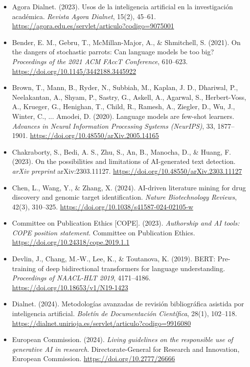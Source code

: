 \begin{itemize}[leftmargin=1.5em, label={}, itemsep=0.22ex, parsep=0pt]
\small\raggedright
{}
    \item Agora Dialnet. (2023). Usos de la inteligencia artificial en la investigación académica. \textit{Revista Agora Dialnet}, 15(2), 45--61. \url{https://agora.edu.es/servlet/articulo?codigo=9075001}
    \item Bender, E. M., Gebru, T., McMillan-Major, A., \& Shmitchell, S. (2021). On the dangers of stochastic parrots: Can language models be too big? \textit{Proceedings of the 2021 ACM FAccT Conference}, 610--623. \url{https://doi.org/10.1145/3442188.3445922}
    \item Brown, T., Mann, B., Ryder, N., Subbiah, M., Kaplan, J. D., Dhariwal, P., Neelakantan, A., Shyam, P., Sastry, G., Askell, A., Agarwal, S., Herbert-Voss, A., Krueger, G., Henighan, T., Child, R., Ramesh, A., Ziegler, D., Wu, J., Winter, C., ... Amodei, D. (2020). Language models are few-shot learners. \textit{Advances in Neural Information Processing Systems (NeurIPS)}, 33, 1877--1901. \url{https://doi.org/10.48550/arXiv.2005.14165}
    \item Chakraborty, S., Bedi, A. S., Zhu, S., An, B., Manocha, D., \& Huang, F. (2023). On the possibilities and limitations of AI-generated text detection. \textit{arXiv preprint} arXiv:2303.11127. \url{https://doi.org/10.48550/arXiv.2303.11127}
    \item Chen, L., Wang, Y., \& Zhang, X. (2024). AI-driven literature mining for drug discovery and genomic target identification. \textit{Nature Biotechnology Reviews}, 42(3), 310--325. \url{https://doi.org/10.1038/s41587-024-02105-w}
    \item Committee on Publication Ethics [COPE]. (2023). \textit{Authorship and AI tools: COPE position statement}. Committee on Publication Ethics. \url{https://doi.org/10.24318/cope.2019.1.1}
    \item Devlin, J., Chang, M.-W., Lee, K., \& Toutanova, K. (2019). BERT: Pre-training of deep bidirectional transformers for language understanding. \textit{Proceedings of NAACL-HLT 2019}, 4171--4186. \url{https://doi.org/10.18653/v1/N19-1423}
    \item Dialnet. (2024). Metodologías avanzadas de revisión bibliográfica asistida por inteligencia artificial. \textit{Boletín de Documentación Científica}, 28(1), 102--118. \url{https://dialnet.unirioja.es/servlet/articulo?codigo=9916080}
    \item European Commission. (2024). \textit{Living guidelines on the responsible use of generative AI in research}. Directorate-General for Research and Innovation, European Commission. \url{https://doi.org/10.2777/26666}

\end{itemize}
